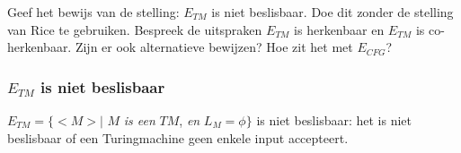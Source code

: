 \begin{quest}[$E_{TM}$]
	Geef het bewijs van de stelling: $E_{TM}$ is niet beslisbaar. Doe dit zonder de stelling van Rice te gebruiken. Bespreek de uitspraken $E_{TM}$ is herkenbaar en $E_{TM}$ is co-herkenbaar. Zijn er ook alternatieve bewijzen? Hoe zit het met $E_{CFG}$?
\end{quest}

\subsubsection*{$E_{TM}$ is niet beslisbaar}

\begin{theorem}[$E_{TM}$]
	$E_{TM} = \{<M>|$ $M$ \textit{is een} $TM$, \textit{en} $L_M = \phi \}$ is niet beslisbaar: het is niet beslisbaar of een Turingmachine geen enkele input accepteert.
\end{theorem}

